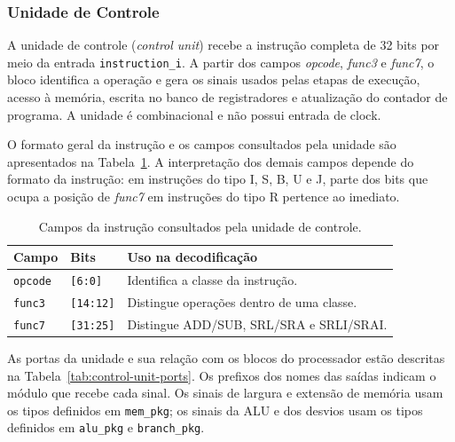 
\subsubsection{Unidade de Controle}
\label{subsub:control_unit}

A unidade de controle (\textit{control unit}) recebe a instrução completa de 32 bits por meio da entrada \texttt{instruction\_i}. A partir dos campos \textit{opcode}, \textit{func3} e \textit{func7}, o bloco identifica a operação e gera os sinais usados pelas etapas de execução, acesso à memória, escrita no banco de registradores e atualização do contador de programa. A unidade é combinacional e não possui entrada de clock.

O formato geral da instrução e os campos consultados pela unidade são apresentados na Tabela~\ref{tab:control-unit-fields}. A interpretação dos demais campos depende do formato da instrução: em instruções do tipo I, S, B, U e J, parte dos bits que ocupa a posição de \textit{func7} em instruções do tipo R pertence ao imediato.

\begin{table}[!htb]
\centering
\caption{Campos da instrução consultados pela unidade de controle.}
\label{tab:control-unit-fields}
\begin{tabular}{lll}
\toprule
\textbf{Campo} & \textbf{Bits} & \textbf{Uso na decodificação} \\
\midrule
\texttt{opcode} & \texttt{[6:0]} & Identifica a classe da instrução. \\
\texttt{func3} & \texttt{[14:12]} & Distingue operações dentro de uma classe. \\
\texttt{func7} & \texttt{[31:25]} & Distingue ADD/SUB, SRL/SRA e SRLI/SRAI. \\
\bottomrule
\end{tabular}
\end{table}

As portas da unidade e sua relação com os blocos do processador estão descritas na Tabela~\ref{tab:control-unit-ports}. Os prefixos dos nomes das saídas indicam o módulo que recebe cada sinal. Os sinais de largura e extensão de memória usam os tipos definidos em \texttt{mem\_pkg}; os sinais da ALU e dos desvios usam os tipos definidos em \texttt{alu\_pkg} e \texttt{branch\_pkg}.

